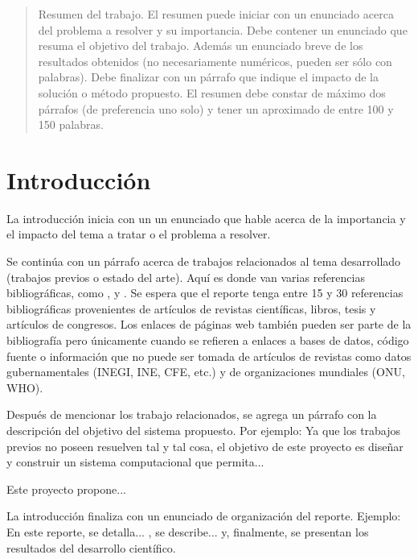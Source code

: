 \documentclass[letterpaper, 11pt]{article}
\begin{document}
%
\begin{abstract}
 Resumen del trabajo. El resumen puede iniciar con un enunciado acerca del problema a resolver y su importancia. Debe contener un enunciado que resuma el objetivo del trabajo. Además un enunciado breve de los resultados obtenidos (no necesariamente numéricos, pueden ser sólo con palabras). Debe finalizar con un párrafo que indique el impacto de la solución o método propuesto. El resumen debe constar de máximo dos párrafos (de preferencia uno solo) y tener un aproximado de entre 100 y 150 palabras.
\end{abstract}



%
\section{Introducción}
La introducción inicia con un un enunciado que hable acerca de la importancia y el impacto del tema a tratar o el problema a resolver.

Se continúa con un párrafo acerca de trabajos relacionados al tema desarrollado (trabajos previos o estado del arte). Aquí es donde van varias referencias bibliográficas, como \cite{Lee2012}, \cite{Fjeld2002} y \cite{Zhou2008}. Se espera que el reporte tenga entre 15 y 30 referencias bibliográficas provenientes de artículos de revistas científicas, libros, tesis y artículos de congresos. Los enlaces de páginas web también pueden ser parte de la bibliografía pero únicamente cuando se refieren a enlaces a bases de datos, código fuente o información que no puede ser tomada de artículos de revistas como datos gubernamentales (INEGI, INE, CFE, etc.) y de organizaciones mundiales (ONU, WHO).

Después de mencionar los trabajo relacionados, se agrega un párrafo con la descripción del objetivo del sistema propuesto. Por ejemplo: Ya que los trabajos previos no poseen resuelven tal y tal cosa, el objetivo de este proyecto es diseñar y construir un sistema computacional que permita...

Este proyecto propone...

La introducción finaliza con un enunciado de organización del reporte. Ejemplo: En este reporte, se detalla... , se describe... y, finalmente, se presentan los resultados del desarrollo científico.
\end{document}

